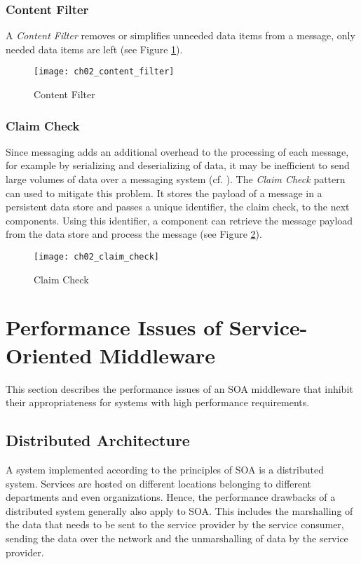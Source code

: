 \subsubsection{Content Filter}
A \emph{Content Filter} removes or simplifies unneeded data items from a message, only needed data items are left (see Figure \ref{fig:ch02_content_filter}).

\begin{figure}[htbp]
	\centering
	\texttt{[image: ch02\_content\_filter]}
	\caption{Content Filter \citep{Hohpe:2003fk}}
	\label{fig:ch02_content_filter}
\end{figure}

\subsubsection{Claim Check}

Since messaging adds an additional overhead to the processing of each message, for example by serializing and deserializing of data, it may be inefficient to send large volumes of data over a messaging system (cf. \cite{Hohpe:2003fk}). The \emph{Claim Check} pattern can used to mitigate this problem. It stores the payload of a message in a persistent data store and passes a unique identifier, the claim check, to the next components. Using this identifier, a component can retrieve the message payload from the data store and process the message (see Figure \ref{fig:ch02_claim_check}).

\begin{figure}[htbp]
	\centering
	\texttt{[image: ch02\_claim\_check]}
	\caption{Claim Check \citep{Hohpe:2003fk}}
	\label{fig:ch02_claim_check}
\end{figure}

\section{Performance Issues of Service-Oriented Middleware}
\label{sec:ch02_performance_issues}
This section describes the performance issues of an SOA middleware that inhibit their appropriateness for systems with high performance requirements.
\subsection{Distributed Architecture}
A system implemented according to the principles of SOA is a distributed system. Services are hosted on different locations belonging to different departments and even organizations. Hence, the performance drawbacks of a distributed system generally also apply to SOA. This includes the marshalling of the data that needs to be sent to the service provider by the service consumer, sending the data over the network and the unmarshalling of data by the service provider.
